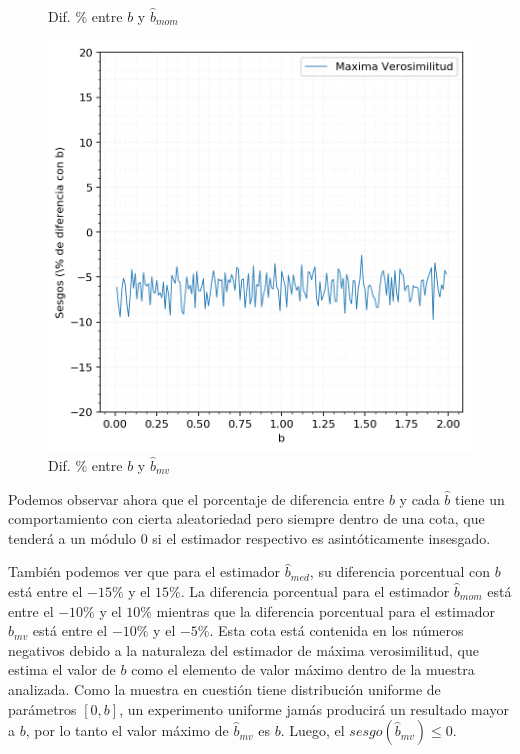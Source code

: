 \begin{figure}[H]
\begin{minipage}[t]{.325\textwidth}
		\caption{\footnotesize Dif. \% entre $b$ y $\hat{b}_{mom}$}
		\label{fig:ej6-sesgos-err-mom}
	\end{minipage}
	\begin{minipage}[t]{.325\textwidth}
		\centering
		\includegraphics[scale=0.37]{imagenes/sesgos-mv-porcentaje-err.png}
		\caption{\footnotesize Dif. \% entre $b$ y $\hat{b}_{mv}$}
		\label{fig:ej6-sesgos-err-mv}
	\end{minipage}
\end{figure}

Podemos observar ahora que el porcentaje de diferencia entre $b$ y cada $\hat{b}$ tiene un comportamiento con cierta aleatoriedad pero siempre dentro de una cota, que tenderá a un módulo $0$ si el estimador respectivo es asintóticamente insesgado.

\vskip 8pt

También podemos ver que para el estimador $\hat{b}_{med}$, su diferencia porcentual con $b$ está entre el $-15\%$ y el $15\%$. La diferencia porcentual para el estimador $\hat{b}_{mom}$ está entre el $-10\%$ y el $10\%$ mientras que la diferencia porcentual para el estimador $\hat{b}_{mv}$ está entre el $-10\%$ y el $-5\%$. Esta cota está contenida en los números negativos debido a la naturaleza del estimador de máxima verosimilitud, que estima el valor de $b$ como el elemento de valor máximo dentro de la muestra analizada. Como la muestra en cuestión tiene distribución uniforme de parámetros $[0, b]$, un experimento uniforme jamás producirá un resultado mayor a $b$, por lo tanto el valor máximo de $\hat{b}_{mv}$ es $b$. Luego, el $sesgo(\hat{b}_{mv}) \leq 0$.

